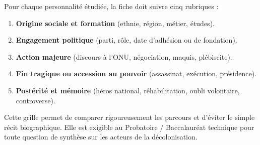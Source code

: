 \documentclass[11pt]{article}
\begin{document}
\begin{methode}
Pour chaque personnalité étudiée, la fiche doit suivre cinq rubriques :
\begin{enumerate}
\item \textbf{Origine sociale et formation} (ethnie, région, métier, études).
\item \textbf{Engagement politique} (parti, rôle, date d'adhésion ou de fondation).
\item \textbf{Action majeure} (discours à l'ONU, négociation, maquis, plébiscite).
\item \textbf{Fin tragique ou accession au pouvoir} (assassinat, exécution, présidence).
\item \textbf{Postérité et mémoire} (héros national, réhabilitation, oubli volontaire, controverse).
\end{enumerate}
Cette grille permet de comparer rigoureusement les parcours et d'éviter le simple récit biographique. Elle est exigible au Probatoire / Baccalauréat technique pour toute question de synthèse sur les acteurs de la décolonisation.
\end{methode}
\end{document}
